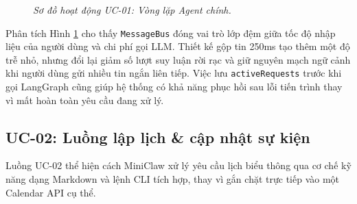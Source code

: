 \begin{figure}[p]
{
  }
  \caption{\emph{Sơ đồ hoạt động UC-01: Vòng lặp Agent chính.}}
  \label{fig:activity-uc01}
\end{figure}
\clearpage

Phân tích Hình \ref{fig:activity-uc01} cho thấy \texttt{MessageBus} đóng vai trò lớp đệm giữa tốc độ nhập liệu của người dùng và chi phí gọi LLM. Thiết kế gộp tin 250ms tạo thêm một độ trễ nhỏ, nhưng đổi lại giảm số lượt suy luận rời rạc và giữ nguyên mạch ngữ cảnh khi người dùng gửi nhiều tin ngắn liên tiếp. Việc lưu \texttt{activeRequests} trước khi gọi LangGraph cũng giúp hệ thống có khả năng phục hồi sau lỗi tiến trình thay vì mất hoàn toàn yêu cầu đang xử lý.

\subsection{UC-02: Luồng lập lịch \& cập nhật sự kiện}
Luồng UC-02 thể hiện cách MiniClaw xử lý yêu cầu lịch biểu thông qua cơ chế kỹ năng dạng Markdown và lệnh CLI tích hợp, thay vì gắn chặt trực tiếp vào một Calendar API cụ thể.

